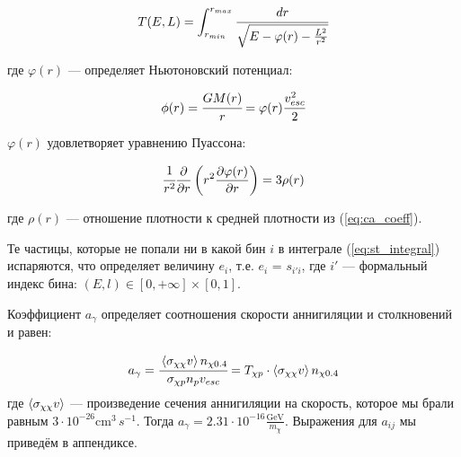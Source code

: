 \begin{equation*}
	T(E,L) = \int_{r_{min}}^{r_{max}}{\cfrac{dr}{
			\sqrt{E - \varphi(r) - \frac{L^2}{r^2}}
		} 
	}
\end{equation*}

где $\varphi(r)$ --- определяет Ньютоновский потенциал:

\begin{equation*}
	\phi(r) = \cfrac{GM(r)}{r} = \varphi(r) \cfrac{v_{esc}^2}{2} 
\end{equation*}

$\varphi(r)$ удовлетворяет уравнению Пуассона:

\begin{equation}
	\cfrac{1}{r^2}\frac{\partial }{\partial r}
	\left(r^2\frac{\partial \varphi(r)}{\partial r}\right) = 3\rho(r)
\end{equation}

где $\rho(r)$ --- отношение плотности к средней плотности из (\ref{eq:ca_coeff}).


Те частицы, которые не попали ни в какой бин $i$ в интеграле (\ref{eq:st_integral}) испаряются, что определяет величину $e_i$, т.е. $e_i$ = $s_{i'i}$, где $i'$ --- формальный индекс бина: $(E,l) \in [0,+\infty]\times[0,1]$.

Коэффициент $a_{\gamma}$ определяет соотношения скорости аннигиляции и столкновений и равен:

\begin{equation}
	a_{\gamma} = \cfrac{ \left\langle \sigma_{\chi\chi} v \right\rangle n_{\chi 0.4}}{\sigma_{\chi p} n_{p} v_{esc}} = 
	T_{\chi p} \cdot \left\langle \sigma_{\chi\chi} v \right\rangle n_{\chi 0.4}
\end{equation}
где $\left\langle \sigma_{\chi\chi} v \right\rangle$ --- произведение сечения аннигиляции на скорость, которое мы брали равным $3\cdot10^{-26}\text{cm}^3\,{s^{-1}}$. Тогда $a_{\gamma} = 2.31\cdot10^{-16} \frac{\text{GeV}}{m_{\chi}}$. Выражения для $a_{ij}$ мы приведём в аппендиксе.

